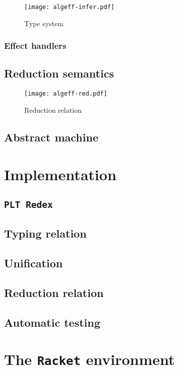 \documentclass[inz, english, shortabstract]{iithesis}
\newcommand{\Redex}{\texttt{PLT Redex} }
\newcommand{\Racket}{\texttt{Racket} }
\begin{document}
\begin{figure}
  \centering
  \texttt{[image: algeff-infer.pdf]}
  \caption{Type system} 
  \label{fig:algeff-infer} 
\end{figure}

\subsection{Effect handlers}


\section{Reduction semantics}
\begin{figure}
  \centering
  \texttt{[image: algeff-red.pdf]}
  \caption{Reduction relation} 
  \label{fig:algeff-red}
\end{figure}


\section{Abstract machine}


\chapter{Implementation}\label{ch:implementation}

\section{\Redex}

\section{Typing relation}

\section{Unification}

\section{Reduction relation}

\section{Automatic testing}


\chapter{The \Racket environment}\label{ch:racket}
\end{document}
